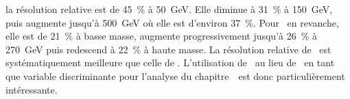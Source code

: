 la résolution relative est de \SI{45}{\%} à \SI{50}{\GeV}.
Elle diminue à \SI{31}{\%} à \SI{150}{\GeV},
puis augmente jusqu'à \SI{500}{\GeV} où elle est d'environ \SI{37}{\%}.
Pour \mml\ en revanche,
elle est de \SI{21}{\%} à basse masse,
augmente progressivement jusqu'à \SI{26}{\%} à \SI{270}{\GeV}
puis redescend à \SI{22}{\%} à haute masse.
La résolution relative de \mml\ est systématiquement meilleure que celle de \mTtot.
L'utilisation de \mml\ au lieu de \mTtot\ en tant que variable discriminante pour l'analyse du chapitre~\ est donc particulièrement intéressante.
%
%
%
